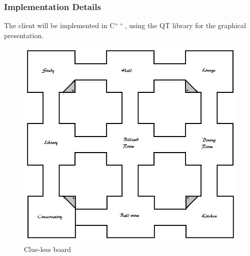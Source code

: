 \documentclass[10pt]{article}
\begin{document}
\subsubsection[Implementation Details]{Implementation Details}
The client will be implemented in C$^{++}$, using the QT library for the graphical presentation.



\pagebreak
\begin{figure}
\centering
\includegraphics[width=0.9\columnwidth]{board}
\caption{\label{fig1}Clue-less board}
\end{figure}
\end{document}
